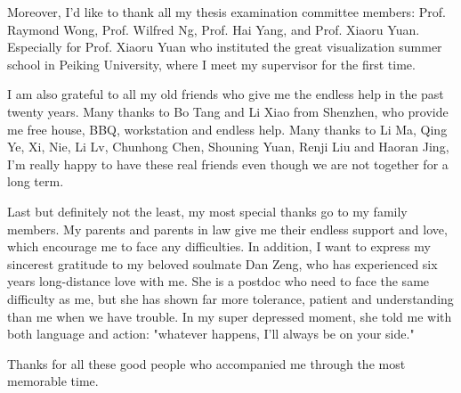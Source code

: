 Moreover, I'd like to thank all my thesis examination committee members: Prof. Raymond Wong, Prof. Wilfred Ng, Prof. Hai Yang, and Prof. Xiaoru Yuan. Especially for Prof. Xiaoru Yuan who instituted the great visualization summer school in Peiking University, where I meet my supervisor for the first time.  

I am also grateful to all my old friends who give me the endless help in the past twenty years. Many thanks to Bo Tang and Li Xiao from Shenzhen, who provide me free house, BBQ, workstation and endless help.  Many thanks to Li Ma, Qing Ye, Xi, Nie, Li Lv, Chunhong Chen, Shouning Yuan, Renji Liu and Haoran Jing, I'm really happy to have these real friends even though we are not together for a long term.

Last but definitely not the least, my most special thanks go to my family members. My parents and parents in law give me their endless support and love, which encourage me to face any difficulties. In addition, I want to express my sincerest gratitude to my beloved soulmate Dan Zeng, who has experienced six years long-distance love with me. She is a postdoc who need to face the same difficulty as me, but she has shown far more tolerance, patient and understanding than me when we have trouble. In my super depressed moment, she told me with both language and action: "whatever happens, I'll always be on your side." 

Thanks for all these good people who accompanied me through the most memorable time. 

\endacknowledgments
